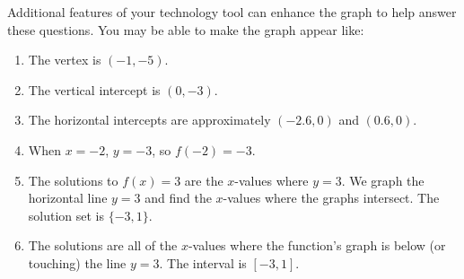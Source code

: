 \documentclass{ximera}
\begin{document}
\begin{example}
\begin{explanation}
\begin{image}
\end{image}
            Additional features of your technology tool can enhance the graph to help answer these questions.
            You may be able to make the graph appear like:
\begin{image}
   \end{image}
\begin{enumerate}
                \item The vertex is $(-1,-5)$.
                \item The vertical intercept is $(0,-3)$.
                \item The horizontal intercepts are approximately $(-2.6,0)$ and $(0.6,0)$.
              \item  When $x=-2$, $y=-3$, so $f(-2)=-3$.
 	 \item The solutions to $f(x)=3$ are the $x$-values where $y=3$. We graph the horizontal line $y=3$ and find the $x$-values where the graphs intersect. The solution set is $\{-3,1\}$.
       	\item  The solutions are all of the $x$-values where the function's graph is below (or touching) the line $y=3$. The interval is $[-3,1]$.
\end{enumerate}
\end{explanation}
\end{example}
\end{document}
